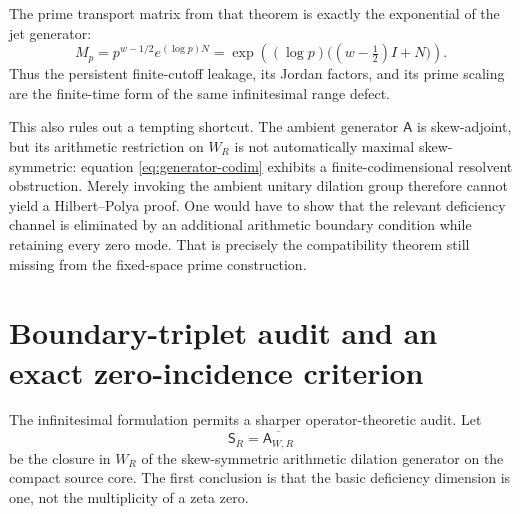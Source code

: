 \documentclass[11pt]{article}
\theoremstyle{remark}
\begin{document}
The prime transport matrix from that theorem is exactly the exponential of the jet generator:
\begin{equation}\label{eq:jet-exponential}
 M_p
 =p^{w-1/2}e^{(\log p)N}
 =\exp\!\left((\log p)\bigl((w-\tfrac12)I+N\bigr)\right).
\end{equation}
Thus the persistent finite-cutoff leakage, its Jordan factors, and its prime scaling are the finite-time form of the same infinitesimal range defect.

This also rules out a tempting shortcut.  The ambient generator $\mathsf A$ is skew-adjoint, but its arithmetic restriction on $W_R$ is not automatically maximal skew-symmetric: equation \eqref{eq:generator-codim} exhibits a finite-codimensional resolvent obstruction.  Merely invoking the ambient unitary dilation group therefore cannot yield a Hilbert--Polya proof.  One would have to show that the relevant deficiency channel is eliminated by an additional arithmetic boundary condition while retaining every zero mode.  That is precisely the compatibility theorem still missing from the fixed-space prime construction.


\section{Boundary-triplet audit and an exact zero-incidence criterion}
The infinitesimal formulation permits a sharper operator-theoretic audit.  Let
\[
 \mathsf S_R=\overline{\mathsf A_{W,R}}
\]
be the closure in $W_R$ of the skew-symmetric arithmetic dilation generator on the compact source core.  The first conclusion is that the basic deficiency dimension is one, not the multiplicity of a zeta zero.
\end{document}
